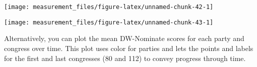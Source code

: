 \documentclass[]{book}
\newenvironment{Shaded}{\begin{snugshade}}{\end{snugshade}}
\newcommand{\KeywordTok}[1]{\textcolor[rgb]{0.13,0.29,0.53}{\textbf{#1}}}
\newcommand{\DataTypeTok}[1]{\textcolor[rgb]{0.13,0.29,0.53}{#1}}
\newcommand{\StringTok}[1]{\textcolor[rgb]{0.31,0.60,0.02}{#1}}
\newcommand{\OperatorTok}[1]{\textcolor[rgb]{0.81,0.36,0.00}{\textbf{#1}}}
\newcommand{\NormalTok}[1]{#1}
\theoremstyle{definition}
\theoremstyle{definition}
\theoremstyle{definition}
\theoremstyle{remark}
\begin{document}
\begin{center}\texttt{[image: measurement\_files/figure-latex/unnamed-chunk-42-1]} \end{center}

\begin{Shaded}
\end{Shaded}

\begin{center}\texttt{[image: measurement\_files/figure-latex/unnamed-chunk-43-1]} \end{center}

Alternatively, you can plot the mean DW-Nominate scores for each party
and congress over time. This plot uses color for parties and lets the
points and labels for the first and last congresses (80 and 112) to
convey progress through time.
\end{document}
